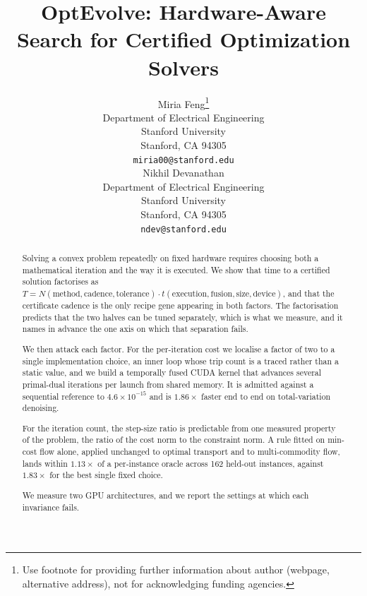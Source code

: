 \documentclass{article}
\title{OptEvolve: Hardware-Aware Search for Certified Optimization Solvers}
\author{%
  Miria Feng\thanks{Use footnote for providing further information
    about author (webpage, alternative address), not for acknowledging
    funding agencies.} \\
  Department of Electrical Engineering\\
  Stanford University\\
  Stanford, CA 94305 \\
  \texttt{miria00@stanford.edu} \\
  \And
  Nikhil Devanathan \\
  Department of Electrical Engineering \\
  Stanford University \\
  Stanford, CA 94305 \\
  \texttt{ndev@stanford.edu} \\
}
\theoremstyle{definition}
\theoremstyle{remark}
\begin{document}
\maketitle


\begin{abstract}
Solving a convex problem repeatedly on fixed hardware requires choosing both a
mathematical iteration and the way it is executed. We show that time to a
certified solution factorises as $T = N(\text{method}, \text{cadence},
\text{tolerance}) \cdot t(\text{execution}, \text{fusion}, \text{size},
\text{device})$, and that the certificate cadence is the only recipe gene
appearing in both factors. The factorisation predicts that the two halves can
be tuned separately, which is what we measure, and it names in advance the one
axis on which that separation fails.

We then attack each factor. For the per-iteration cost we localise a factor of
two to a single implementation choice, an inner loop whose trip count is a
traced rather than a static value, and we build a temporally fused CUDA kernel
that advances several primal-dual iterations per launch from shared memory. It
is admitted against a sequential reference to $4.6 \times 10^{-15}$ and is
$1.86\times$ faster end to end on total-variation denoising.

For the iteration count, the step-size ratio is predictable from one measured
property of the problem, the ratio of the cost norm to the constraint norm. A
rule fitted on min-cost flow alone, applied unchanged to optimal transport and
to multi-commodity flow, lands within $1.13\times$ of a per-instance oracle
across 162 held-out instances, against $1.83\times$ for the best single fixed
choice.

We measure two GPU architectures, and we report the settings at which each
invariance fails.
\end{abstract}
\end{document}
